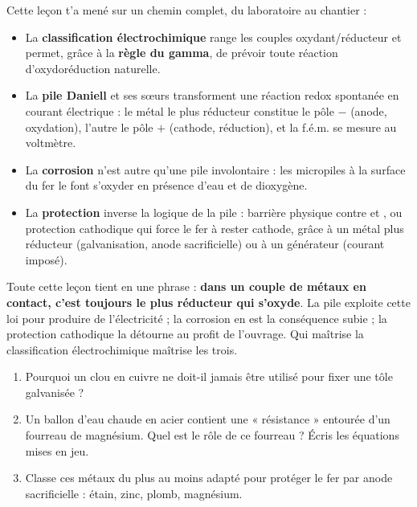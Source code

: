 \documentclass[11pt]{article}
\newcounter{popsec}
\newcounter{popsub}
\newcommand{\courssub}[1]{%
  \stepcounter{popsub}%
  \par\vspace{9pt}\noindent{\popxbold\fontsize{11.5}{13}\selectfont\color{popink}{\color{poporange}\thepopsec.\thepopsub}\hspace{6pt}#1}\par\nopagebreak\vspace{4pt}
}
\begin{document}
\courssub{Bilan de la leçon}

Cette leçon t'a mené sur un chemin complet, du laboratoire au chantier :

\begin{itemize}
\item La \textbf{classification électrochimique} range les couples oxydant/réducteur et permet, grâce à la \textbf{règle du gamma}, de prévoir toute réaction d'oxydoréduction naturelle.
\item La \textbf{pile Daniell} et ses sœurs transforment une réaction redox spontanée en courant électrique : le métal le plus réducteur constitue le pôle $-$ (anode, oxydation), l'autre le pôle $+$ (cathode, réduction), et la f.é.m. se mesure au voltmètre.
\item La \textbf{corrosion} n'est autre qu'une pile involontaire : les micropiles à la surface du fer le font s'oxyder en présence d'eau et de dioxygène.
\item La \textbf{protection} inverse la logique de la pile : barrière physique contre  et , ou protection cathodique qui force le fer à rester cathode, grâce à un métal plus réducteur (galvanisation, anode sacrificielle) ou à un générateur (courant imposé).
\end{itemize}

\begin{aretenir}
Toute cette leçon tient en une phrase : \textbf{dans un couple de métaux en contact, c'est toujours le plus réducteur qui s'oxyde}. La pile exploite cette loi pour produire de l'électricité ; la corrosion en est la conséquence subie ; la protection cathodique la détourne au profit de l'ouvrage. Qui maîtrise la classification électrochimique maîtrise les trois.
\end{aretenir}

\begin{exercice}
\begin{enumerate}
\item Pourquoi un clou en cuivre ne doit-il jamais être utilisé pour fixer une tôle galvanisée ?
\item Un ballon d'eau chaude en acier contient une « résistance » entourée d'un fourreau de magnésium. Quel est le rôle de ce fourreau ? Écris les équations mises en jeu.
\item Classe ces métaux du plus au moins adapté pour protéger le fer par anode sacrificielle : étain, zinc, plomb, magnésium.
\end{enumerate}
\end{exercice}
\end{document}
